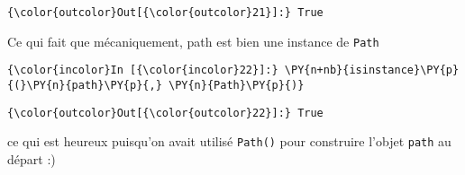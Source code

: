 \begin{Verbatim}[commandchars=\\\{\}]
{\color{outcolor}Out[{\color{outcolor}21}]:} True
\end{Verbatim}
            
    Ce qui fait que mécaniquement, path est bien une instance de
\texttt{Path}

    \begin{Verbatim}[commandchars=\\\{\}]
{\color{incolor}In [{\color{incolor}22}]:} \PY{n+nb}{isinstance}\PY{p}{(}\PY{n}{path}\PY{p}{,} \PY{n}{Path}\PY{p}{)}
\end{Verbatim}


\begin{Verbatim}[commandchars=\\\{\}]
{\color{outcolor}Out[{\color{outcolor}22}]:} True
\end{Verbatim}
            
    ce qui est heureux puisqu'on avait utilisé \texttt{Path()} pour
construire l'objet \texttt{path} au départ :)